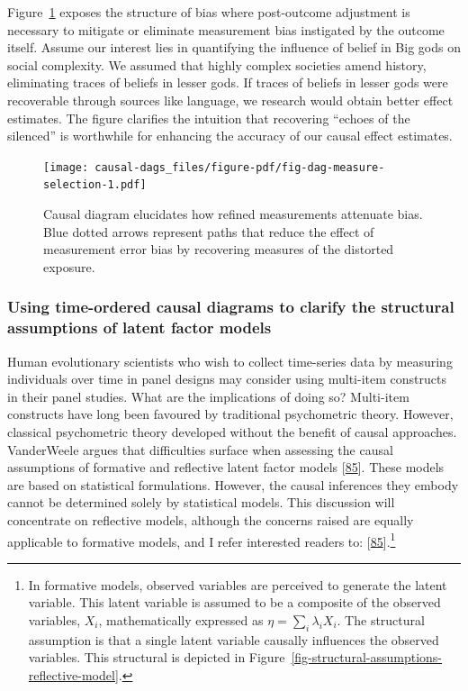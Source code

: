 \documentclass[
  singlecolumn]{article}
\begin{document}
Figure~\ref{fig-dag-measure-selection} exposes the structure of bias
where post-outcome adjustment is necessary to mitigate or eliminate
measurement bias instigated by the outcome itself. Assume our interest
lies in quantifying the influence of belief in Big gods on social
complexity. We assumed that highly complex societies amend history,
eliminating traces of beliefs in lesser gods. If traces of beliefs in
lesser gods were recoverable through sources like language, we research
would obtain better effect estimates. The figure clarifies the intuition
that recovering ``echoes of the silenced'' is worthwhile for enhancing
the accuracy of our causal effect estimates.

\begin{figure}

{\centering \texttt{[image: causal-dags\_files/figure-pdf/fig-dag-measure-selection-1.pdf]}

}

\caption{\label{fig-dag-measure-selection}Causal diagram elucidates how
refined measurements attenuate bias. Blue dotted arrows represent paths
that reduce the effect of measurement error bias by recovering measures
of the distorted exposure.}

\end{figure}

\hypertarget{using-time-ordered-causal-diagrams-to-clarify-the-structural-assumptions-of-latent-factor-models}{%
\subsubsection{Using time-ordered causal diagrams to clarify the
structural assumptions of latent factor
models}\label{using-time-ordered-causal-diagrams-to-clarify-the-structural-assumptions-of-latent-factor-models}}

Human evolutionary scientists who wish to collect time-series data by
measuring individuals over time in panel designs may consider using
multi-item constructs in their panel studies. What are the implications
of doing so? Multi-item constructs have long been favoured by
traditional psychometric theory. However, classical psychometric theory
developed without the benefit of causal approaches. VanderWeele argues
that difficulties surface when assessing the causal assumptions of
formative and reflective latent factor models
{[}\protect\hyperlink{ref-vanderweele2022}{85}{]}. These models are
based on statistical formulations. However, the causal inferences they
embody cannot be determined solely by statistical models. This
discussion will concentrate on reflective models, although the concerns
raised are equally applicable to formative models, and I refer
interested readers to:
{[}\protect\hyperlink{ref-vanderweele2022}{85}{]}.\footnote{In formative
  models, observed variables are perceived to generate the latent
  variable. This latent variable is assumed to be a composite of the
  observed variables, \(X_i\), mathematically expressed as
  \(\eta = \sum_i\lambda_i X_i\). The structural assumption is that a
  single latent variable causally influences the observed variables.
  This structural is depicted in
  Figure~\ref{fig-structural-assumptions-reflective-model}.}
\end{document}
